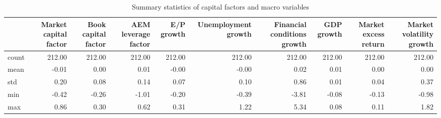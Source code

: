 \begin{table}
\caption{Summary statistics of capital factors and macro variables}
\label{tab:Table 2.1}
\begin{tabular}{lrrrrrrrrr}
\toprule
 & Market capital factor & Book capital factor & AEM leverage factor & E/P growth & Unemployment growth & Financial conditions growth & GDP growth & Market excess return & Market volatility growth \\
\midrule
count & 212.00 & 212.00 & 212.00 & 212.00 & 212.00 & 212.00 & 212.00 & 212.00 & 212.00 \\
mean & -0.01 & 0.00 & 0.01 & -0.00 & -0.00 & 0.02 & 0.01 & 0.00 & 0.00 \\
std & 0.20 & 0.08 & 0.14 & 0.07 & 0.10 & 0.86 & 0.01 & 0.04 & 0.37 \\
min & -0.42 & -0.26 & -1.01 & -0.20 & -0.39 & -3.81 & -0.08 & -0.13 & -0.98 \\
max & 0.86 & 0.30 & 0.62 & 0.31 & 1.22 & 5.34 & 0.08 & 0.11 & 1.82 \\
\bottomrule
\end{tabular}
\end{table}
